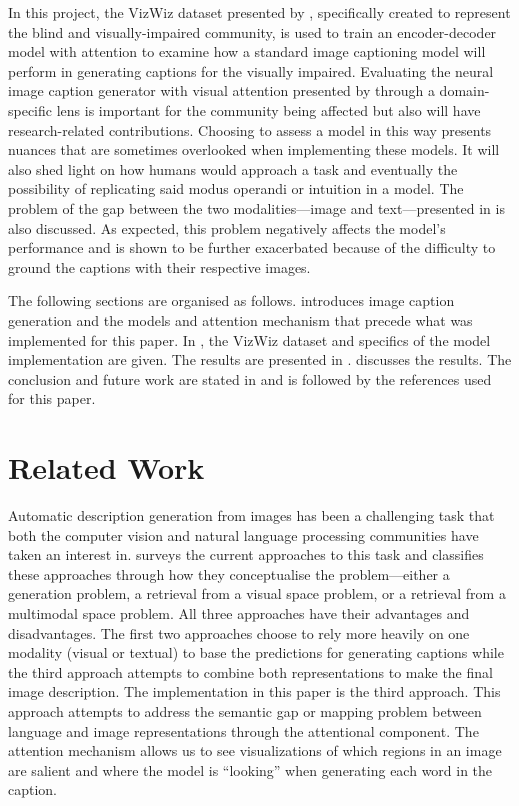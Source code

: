 \documentclass[11pt,a4paper]{article}
\begin{document}
In this project, the VizWiz dataset presented by \citet{Gurari-2020-captioning}, specifically created to represent the blind and visually-impaired community, is used to train an encoder-decoder model with attention to examine how a standard image captioning model will perform in generating captions for the visually impaired. Evaluating the neural image caption generator with visual attention presented by \citet{Xu-2015-show-attend} through a domain-specific lens is important for the community being affected but also will have research-related contributions. Choosing to assess a model in this way presents nuances that are sometimes overlooked when implementing these models. It will also shed light on how humans would approach a task and eventually the possibility of replicating said modus operandi or intuition in a model. The problem of the gap between the two modalities—image and text—presented in \citet{Bernardi-2016-automatic} is also discussed. As expected, this problem negatively affects the model's performance and is shown to be further exacerbated because of the difficulty to ground the captions with their respective images.

The following sections are organised as follows.  introduces image caption generation and the models and attention mechanism that precede what was implemented for this paper. In , the VizWiz dataset and specifics of the model implementation are given. The results are presented in .  discusses the results. The conclusion and future work are stated in  and is followed by the references used for this paper.

\section{Related Work}
\label{sec:relatedwork}
Automatic description generation from images has been a challenging task that both the computer vision and natural language processing communities have taken an interest in. \citet{Bernardi-2016-automatic} surveys the current approaches to this task and classifies these approaches through how they conceptualise the problem—either a generation problem, a retrieval from a visual space problem, or a retrieval from a multimodal space problem. All three approaches have their advantages and disadvantages. The first two approaches choose to rely more heavily on one modality (visual or textual) to base the predictions for generating captions while the third approach attempts to combine both representations to make the final image description. The implementation in this paper is the third approach. This approach attempts to address the semantic gap or mapping problem between language and image representations through the attentional component. The attention mechanism allows us to see visualizations of which regions in an image are salient and where the model is “looking” when generating each word in the caption.
\end{document}
